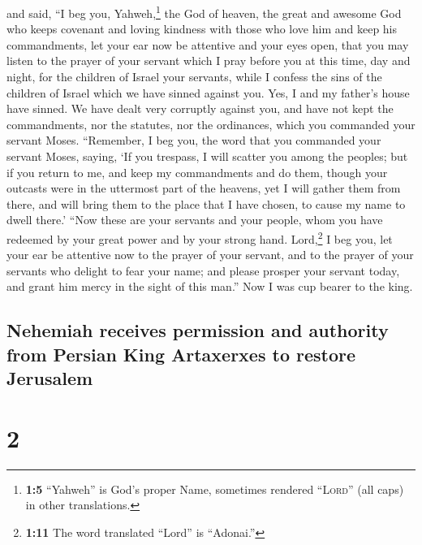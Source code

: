  and said, ``I beg you, Yahweh,\footnote{\textbf{1:5}
  ``Yahweh'' is God's proper Name, sometimes rendered ``\textsc{Lord}''
  (all caps) in other translations.} the God of heaven, the great and
awesome God who keeps covenant and loving kindness with those who love
him and keep his commandments,  let your ear now be
attentive and your eyes open, that you may listen to the prayer of your
servant which I pray before you at this time, day and night, for the
children of Israel your servants, while I confess the sins of the
children of Israel which we have sinned against you. Yes, I and my
father's house have sinned.  We have dealt very corruptly
against you, and have not kept the commandments, nor the statutes, nor
the ordinances, which you commanded your servant Moses. 
``Remember, I beg you, the word that you commanded your servant Moses,
saying, `If you trespass, I will scatter you among the peoples;
 but if you return to me, and keep my commandments and do
them, though your outcasts were in the uttermost part of the heavens,
yet I will gather them from there, and will bring them to the place that
I have chosen, to cause my name to dwell there.'  ``Now
these are your servants and your people, whom you have redeemed by your
great power and by your strong hand.  Lord,\footnote{\textbf{1:11}
  The word translated ``Lord'' is ``Adonai.''} I beg you, let your ear
be attentive now to the prayer of your servant, and to the prayer of
your servants who delight to fear your name; and please prosper your
servant today, and grant him mercy in the sight of this man.'' Now I was
cup bearer to the king.

\hypertarget{nehemiah-receives-permission-and-authority-from-persian-king-artaxerxes-to-restore-jerusalem}{%
\subsection{Nehemiah receives permission and authority from Persian King
Artaxerxes to restore
Jerusalem}\label{nehemiah-receives-permission-and-authority-from-persian-king-artaxerxes-to-restore-jerusalem}}

\hypertarget{section-1}{%
\section{2}\label{section-1}}

